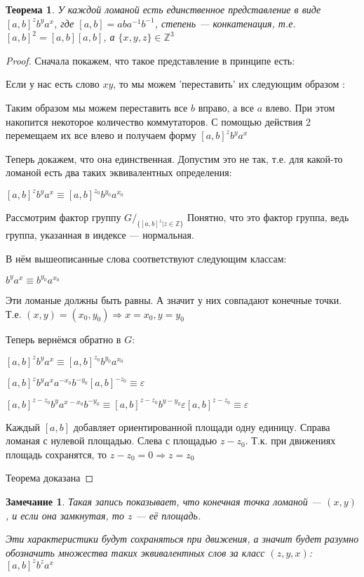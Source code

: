 \documentclass[12pt,a4paper, flushleft]{article}
\newtheorem{Th}{Теорема}[section]
\newtheorem{Zm}{Замечание}[section]
\begin{document}
\begin{Th}
	У каждой ломаной есть единственное представление в виде $[a, b]^zb^ya^x$, где $[a, b] = aba^{-1}b^{-1}$, степень --- конкатенация, т.е. $[a, b]^2 = [a, b][a, b]$, а $\{x, y, z\}\in\mathds{Z}^3$
\end{Th}
\begin{proof}
	Сначала покажем, что такое представление в принципе есть:
	
	Если у нас есть слово $xy$, то мы можем 'переставить' их следующим образом : %
	
	Таким образом мы можем переставить все $b$ вправо, а все $a$ влево. При этом накопится некоторое количество коммутаторов. С помощью действия 2 перемещаем их все влево и получаем форму $[a, b]^zb^ya^x$
	
	Теперь докажем, что она единственная. Допустим это не так, т.е. для какой-то ломаной есть два таких эквивалентных определения:
	
	$[a, b]^zb^ya^x\equiv [a, b]^{z_0}b^{y_0}a^{x_0}$ 
	
	Рассмотрим фактор группу $G/_{\{[a, b]^z|z\in \mathds{Z}\}}$ Понятно, что это фактор группа, ведь группа, указанная в индексе --- нормальная.
	
	В нём вышеописанные слова соответствуют следующим классам:
	
	$b^ya^x\equiv b^{y_0}a^{x_0}$
	
	Эти ломаные должны быть равны. А значит у них совпадают конечные точки. Т.е. $(x, y) = (x_0, y_0)\Rightarrow x = x_0, y = y_0$
	
	Теперь вернёмся обратно в $G:$
	
	$[a, b]^zb^ya^x\equiv [a, b]^{z_0}b^{y_0}a^{x_0}$
	
	$[a, b]^zb^ya^xa^{-x_0}b^{-y_0}[a, b]^{-z_0}\equiv \varepsilon$
	
	$[a, b]^{z-z_0}b^ya^{x-x_0}b^{-y_0}\equiv [a, b]^{z-z_0}b^{y-y_0} \varepsilon [a, b]^{z-z_0}\equiv \varepsilon$
	
	Каждый $[a, b]$ добавляет ориентированной площади одну единицу. Справа ломаная с нулевой площадью. Слева с площадью $z-z_0$. Т.к. при движениях площадь сохранятся, то $z-z_0 = 0\Rightarrow z=z_0$
	
	Теорема доказана
\end{proof}

\begin{Zm}
	Такая запись показывает, что конечная точка ломаной --- $(x, y)$, и если она замкнутая, то $z$ --- её площадь.
	
	Эти характеристики будут сохраняться при движения, а значит будет разумно обозначить множества таких эквивалентных слов за класс $(z, y, x)$: $[a, b]^zb^za^x$
\end{Zm}
\end{document}
